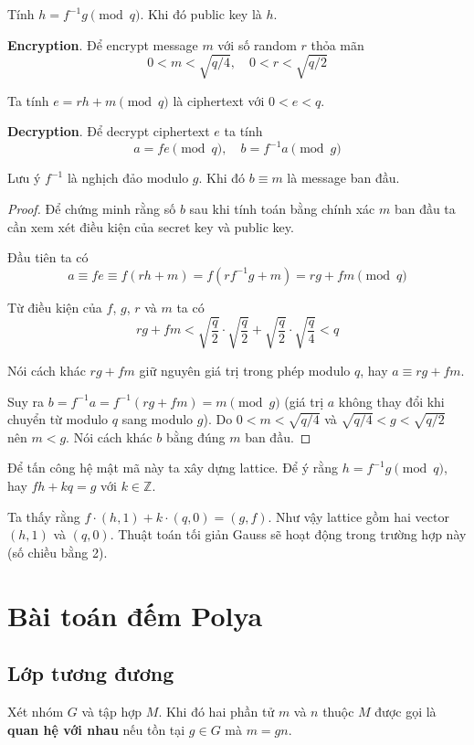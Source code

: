 \documentclass{mynotes}
\newcommand{\ZZ}{\mathbb{Z}}
\begin{document}
Tính $h = f^{-1} g \pmod q$. Khi đó public key là $h$.

\textbf{Encryption}. Để encrypt message $m$ với số random $r$ thỏa mãn \[ 0 < m < \sqrt{q/4}, \quad 0 < r < \sqrt{q/2} \]

Ta tính $e = rh + m \pmod q$ là ciphertext với $0 < e < q$.

\textbf{Decryption}. Để decrypt ciphertext $e$ ta tính \[ a = fe \pmod q, \quad b = f^{-1} a \pmod g \]

Lưu ý $f^{-1}$ là nghịch đảo modulo $g$. Khi đó $b \equiv m$ là message ban đầu.

\begin{proof}
    Để chứng minh rằng số $b$ sau khi tính toán bằng chính xác $m$ ban đầu ta cần xem xét điều kiện của secret key và public key.

    Đầu tiên ta có \[ a \equiv fe \equiv f(rh + m) = f(r f^{-1} g + m) = rg + fm \pmod q \]

    Từ điều kiện của $f$, $g$, $r$ và $m$ ta có \[ rg + fm < \sqrt{\dfrac{q}{2}} \cdot \sqrt{\dfrac{q}{2}} + \sqrt{\dfrac{q}{2}} \cdot \sqrt{\dfrac{q}{4}} < q \]

    Nói cách khác $rg + fm$ giữ nguyên giá trị trong phép modulo $q$, hay $a \equiv rg + fm$.

    Suy ra $b = f^{-1} a = f^{-1} (rg + fm) = m \pmod g$ (giá trị $a$ không thay đổi khi chuyển từ modulo $q$ sang modulo $g$). Do $0 < m < \sqrt{q/4}$ và $\sqrt{q/4} < g < \sqrt{q/2}$ nên $m < g$. Nói cách khác $b$ bằng đúng $m$ ban đầu.
\end{proof}

Để tấn công hệ mật mã này ta xây dựng lattice. Để ý rằng $h = f^{-1} g \pmod q$, hay $fh + kq = g$ với $k \in \ZZ$.

Ta thấy rằng $f \cdot (h, 1) + k \cdot (q, 0) = (g, f)$. Như vậy lattice gồm hai vector $(h, 1)$ và $(q, 0)$. Thuật toán tối giản Gauss sẽ hoạt động trong trường hợp này (số chiều bằng 2).

\chapter{Bài toán đếm Polya}

\section{Lớp tương đương}

Xét nhóm $G$ và tập hợp $M$. Khi đó hai phần tử $m$ và $n$ thuộc $M$ được gọi là \textbf{quan hệ với nhau} nếu tồn tại $g \in G$ mà $m = g n$.
\end{document}

